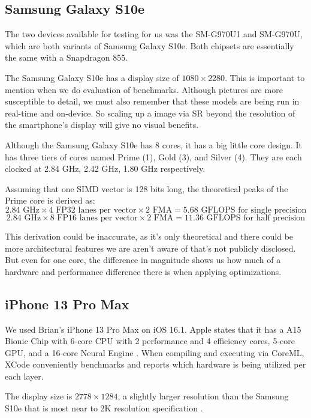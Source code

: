 \documentclass{article}
\begin{document}
\subsection{Samsung Galaxy S10e}
The two devices available for testing for us was the SM-G970U1 and SM-G970U, which are both variants of Samsung Galaxy S10e. Both chipsets are essentially the same with a Snapdragon 855.

The Samsung Galaxy S10e has a display size of $1080 \times 2280$. This is important to mention when we do evaluation of benchmarks. Although pictures are more susceptible to detail, we must also remember that these models are being run in real-time and on-device. So scaling up a image via SR beyond the resolution of the smartphone's display will give no visual benefits.

Although the Samsung Galaxy S10e has 8 cores, it has a big little core design. It has three tiers of cores named Prime (1), Gold (3), and Silver (4). They are each clocked at 2.84 GHz, 2.42 GHz, 1.80 GHz respectively.

Assuming that one SIMD vector is 128 bits long, the theoretical peaks of the Prime core is derived as:
$$2.84 \text{ GHz} \times 4 \text{ FP32 lanes per vector} \times 2 \text{ FMA} = 5.68 \text{ GFLOPS for single precision}$$
$$2.84 \text{ GHz} \times 8 \text{ FP16 lanes per vector} \times 2 \text{ FMA} = 11.36 \text{ GFLOPS for half precision}$$

This derivation could be inaccurate, as it's only theoretical and there could be more architectural features we are aren't aware of that's not publicly disclosed. But even for one core, the difference in magnitude shows us how much of a hardware and performance difference there is when applying optimizations.

\subsection{iPhone 13 Pro Max}
We used Brian's iPhone 13 Pro Max on iOS 16.1. Apple states that it has a A15 Bionic Chip with 6‑core CPU with 2 performance and 4 efficiency cores, 5‑core GPU, and a 16‑core Neural Engine \cite{iphone13promax}. When compiling and executing via CoreML, XCode conveniently benchmarks and reports which hardware is being utilized per each layer.

The display size is $2778 \times 1284$, a slightly larger resolution than the Samsung S10e that is most near to 2K resolution specification \cite{iphone13promax}.
\end{document}
